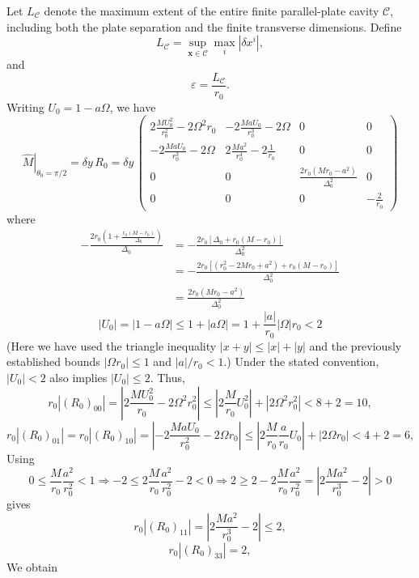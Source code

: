 \documentclass[english]{article}
\begin{document}
Let $L_{\mathcal{C}}$ denote the maximum extent of the entire finite
parallel-plate cavity $\mathcal{C}$, including both the plate separation
and the finite transverse dimensions. Define 
\[
L_{\mathcal{C}}=\sup_{\boldsymbol{x}\in\mathcal{C}}\max_{i}|\delta x^{i}|,
\]
 and 
\[
\varepsilon=\frac{L_{\mathcal{C}}}{r_{0}}.
\]
 Writing $U_{0}=1-a\Omega$, we have 
\[
\left.\hat{M}\right|_{\theta_{0}=\pi/2}=\delta y\,R_{0}=\delta y\,\begin{pmatrix}2\frac{MU^{2}_{0}}{r^{2}_{0}}-2\Omega^{2}r_{0} & -2\frac{MaU_{0}}{r^{3}_{0}}-2\Omega & 0 & 0\\
-2\frac{MaU_{0}}{r^{3}_{0}}-2\Omega & 2\frac{Ma^{2}}{r^{4}_{0}}-2\frac{1}{r_{0}} & 0 & 0\\
0 & 0 & \frac{2r_{0}\left(Mr_{0}-a^{2}\right)}{\Delta^{2}_{0}} & 0\\
0 & 0 & 0 & -\frac{2}{r_{0}}
\end{pmatrix}
\]
 where 
\begin{align*}
-\frac{2r_{0}\left(1+\frac{r_{0}\left(M-r_{0}\right)}{\Delta_{0}}\right)}{\Delta_{0}} & =-\frac{2r_{0}\left[\Delta_{0}+r_{0}\left(M-r_{0}\right)\right]}{\Delta^{2}_{0}}\\
 & =-\frac{2r_{0}\left[\left(r^{2}_{0}-2Mr_{0}+a^{2}\right)+r_{0}\left(M-r_{0}\right)\right]}{\Delta^{2}_{0}}\\
 & =\frac{2r_{0}\left(Mr_{0}-a^{2}\right)}{\Delta^{2}_{0}}
\end{align*}
 {}
\[
|U_{0}|=|1-a\Omega|\leq1+|a\Omega|=1+\frac{|a|}{r_{0}}|\Omega|r_{0}<2
\]
 (Here we have used the triangle inequality $|x+y|\leq|x|+|y|$ and
the previously established bounds $|\Omega r_{0}|\leq1$ and $|a|/r_{0}<1$.)
Under the stated convention, $|U_{0}|<2$ also implies $|U_{0}|\leq2$.
Thus, 
\[
r_{0}\left|\left(R_{0}\right)_{00}\right|=\left|2\frac{MU^{2}_{0}}{r_{0}}-2\Omega^{2}r^{2}_{0}\right|\leq\left|2\frac{M}{r_{0}}U^{2}_{0}\right|+\left|2\Omega^{2}r^{2}_{0}\right|<8+2=10,
\]
 {}
\[
r_{0}\left|\left(R_{0}\right)_{01}\right|=r_{0}\left|\left(R_{0}\right)_{10}\right|=\left|-2\frac{MaU_{0}}{r^{2}_{0}}-2\Omega r_{0}\right|\leq\left|2\frac{M}{r_{0}}\frac{a}{r_{0}}U_{0}\right|+\left|2\Omega r_{0}\right|<4+2=6,
\]
 Using 
\[
0\leq\frac{M}{r_{0}}\frac{a^{2}}{r^{2}_{0}}<1\Rightarrow-2\leq2\frac{M}{r_{0}}\frac{a^{2}}{r^{2}_{0}}-2<0\Rightarrow2\geq2-2\frac{M}{r_{0}}\frac{a^{2}}{r^{2}_{0}}=\left|2\frac{Ma^{2}}{r^{3}_{0}}-2\right|>0
\]
 gives 
\[
r_{0}\left|\left(R_{0}\right)_{11}\right|=\left|2\frac{Ma^{2}}{r^{3}_{0}}-2\right|\leq2,
\]
 {}
\[
r_{0}\left|\left(R_{0}\right)_{33}\right|=2,
\]
 We obtain 
\end{document}
